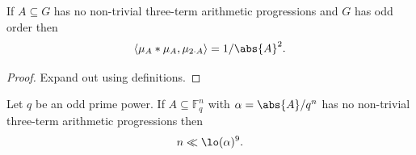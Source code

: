 \begin{lemma}
  \label{no3aps_inner_prod}
  \leanok

  If $A\subseteq G$ has no non-trivial three-term arithmetic progressions and $G$ has odd order then
  \[\langle \mu_A\ast \mu_A,\mu_{2\cdot A}\rangle = 1/\abs{A}^2.\]
\end{lemma}
\begin{proof}
  \leanok

  Expand out using definitions.
\end{proof}


\begin{theorem}
  \label{ff}
  \uses{}
  \leanok

  Let $q$ be an odd prime power. If $A\subseteq \mathbb{F}_q^n$ with $\alpha=\abs{A}/q^n$ has no non-trivial three-term arithmetic progressions then
  \[n \ll \lo(\alpha)^9.\]
\end{theorem}
